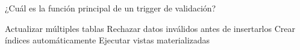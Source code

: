 \question[1] ¿Cuál es la función principal de un trigger de validación?
\begin{choices}
\choice Actualizar múltiples tablas
\CorrectChoice Rechazar datos inválidos antes de insertarlos
\choice Crear índices automáticamente
\choice Ejecutar vistas materializadas
\end{choices}
